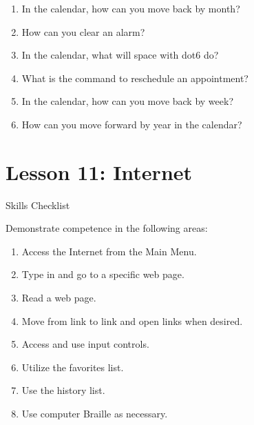 \documentclass[10pt,letterpaper,twoside]{report}
\begin{document}
{{{{\begin{enumerate}
	\item In the calendar, how can you move back by month?
	      
	\item How can you clear an alarm?
	      
	\item In the calendar, what will space with dot6 do?
	      
	\item What is the command to reschedule an appointment?
	      
	\item In the calendar, how can you move back by week?
	      
	\item How can you move forward by year in the calendar?
\end{enumerate}



\section*{Lesson 11: Internet}


Skills Checklist



Demonstrate competence in the following areas:



\begin{enumerate}
	\item Access the Internet from the Main Menu.
	      
	\item Type in and go to a specific web page.
	      
	\item Read a web page.
	      
	\item Move from link to link and open links when desired.
	      
	\item Access and use input controls.
	      
	\item Utilize the favorites list.
	      
	\item Use the history list.
	      
	\item Use computer Braille as necessary.
\end{enumerate}



}}}}
\end{document}
